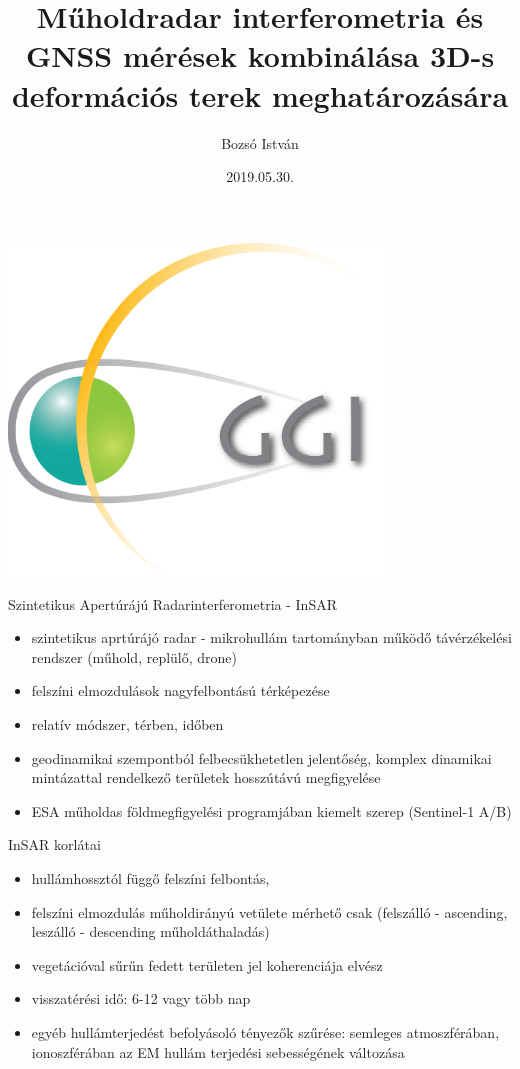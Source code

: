 \documentclass{beamer}
\title[Komplex viszga, ELTE 2019]{Műholdradar interferometria és GNSS mérések
                                  kombinálása 3D-s deformációs terek meghatározására}
\author[Bozsó István]{Bozsó István}
\institute[MTA CSFK GGI]{MTA CSFK Geodéziai és Geofizikai Intézet}
\date{2019.05.30.}
\begin{document}
\begin{frame}
    \titlepage
    \begin{center}
        \begin{minipage}[c]{0.3\textwidth}
            \includegraphics[width=0.75\textwidth]{ggi_logo.png}
        \end{minipage}
    \end{center}
\end{frame}


\begin{frame}{Szintetikus Apertúrájú Radarinterferometria - InSAR}

\begin{itemize}
    \item szintetikus aprtúrájó radar - mikrohullám tartományban működő
    távérzékelési rendszer (műhold, replülő, drone)
    \item felszíni elmozdulások nagyfelbontású térképezése
    \item relatív módszer, térben, időben
    \item geodinamikai szempontból felbecsükhetetlen jelentőség, komplex
    dinamikai mintázattal rendelkező területek hosszútávú megfigyelése
    \item ESA műholdas földmegfigyelési programjában kiemelt szerep
    (Sentinel-1 A/B)
\end{itemize}

\end{frame}


\begin{frame}{InSAR korlátai}

\begin{itemize}
    \item hullámhossztól függő felszíni felbontás, 
    \item felszíni elmozdulás műholdirányú vetülete mérhető csak
    (felszálló - ascending, leszálló - descending műholdáthaladás)
    \item vegetációval sűrűn fedett területen jel koherenciája elvész
    \item visszatérési idő: 6-12 vagy több nap
    \item egyéb hullámterjedést befolyásoló tényezők szűrése: semleges
    atmoszférában, ionoszférában az EM hullám terjedési sebességének változása
\end{itemize}

\end{frame}
\end{document}
